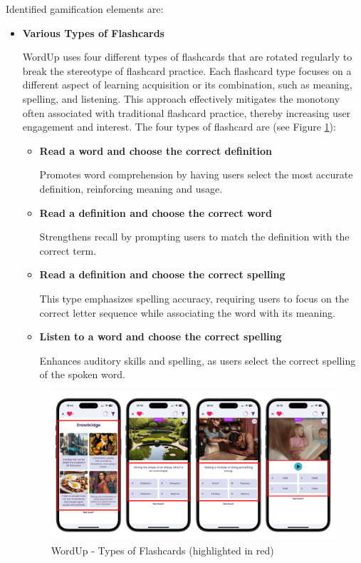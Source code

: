 Identified gamification elements are:

\newpage

\begin{itemize}
    \item \textbf{Various Types of Flashcards}

     WordUp uses four different types of flashcards that are rotated regularly to break the stereotype of flashcard practice. Each flashcard type focuses on a different aspect of learning acquisition or its combination, such as meaning, spelling, and listening. This approach effectively mitigates the monotony often associated with traditional flashcard practice, thereby increasing user engagement and interest. The four types of flashcard are (see Figure \ref{fig:wordup-flashcard-types}):
    
    \begin{itemize}
        \item \textbf{Read a word and choose the correct definition}
        
        Promotes word comprehension by having users select the most accurate definition, reinforcing meaning and usage.
        
        \item \textbf{Read a definition and choose the correct word}

        Strengthens recall by prompting users to match the definition with the correct term.
        
        \item \textbf{Read a definition and choose the correct spelling}

        This type emphasizes spelling accuracy, requiring users to focus on the correct letter sequence while associating the word with its meaning.
        
        \item \textbf{Listen to a word and choose the correct spelling}

        Enhances auditory skills and spelling, as users select the correct spelling of the spoken word.
        
    \end{itemize}

    \begin{figure}[!h]
        \includegraphics[width=1\textwidth]{src/figures/wordup-flashcard-types.png}
        \caption{WordUp - Types of Flashcards (highlighted in red)}
        \label{fig:wordup-flashcard-types}
    \end{figure}
    

\end{itemize}
